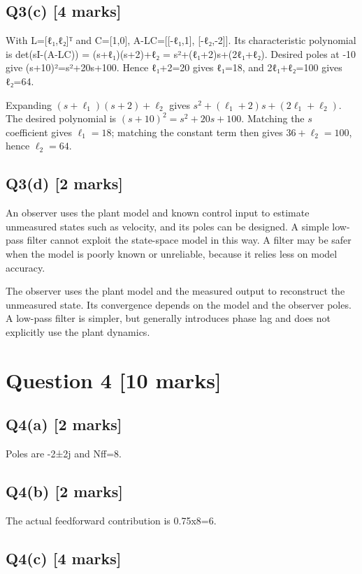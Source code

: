 \documentclass[11pt,a4paper]{article}
\begin{document}
\subsection*{Q3(c) \hfill [4 marks]}

With L=[ℓ₁,ℓ₂]ᵀ and C=[1,0], A-LC=[[-ℓ₁,1], [-ℓ₂,-2]].
Its characteristic polynomial is det(sI-(A-LC)) = (s+ℓ₁)(s+2)+ℓ₂ = s²+(ℓ₁+2)s+(2ℓ₁+ℓ₂).
Desired poles at -10 give (s+10)²=s²+20s+100.
Hence ℓ₁+2=20 gives ℓ₁=18, and 2ℓ₁+ℓ₂=100 gives ℓ₂=64.\par\smallskip Expanding $(s+\ell_1)(s+2)+\ell_2$ gives $s^2+(\ell_1+2)s+(2\ell_1+\ell_2)$. The desired polynomial is $(s+10)^2=s^2+20s+100$. Matching the $s$ coefficient gives $\ell_1=18$; matching the constant term then gives $36+\ell_2=100$, hence $\ell_2=64$.

\subsection*{Q3(d) \hfill [2 marks]}

An observer uses the plant model and known control input to estimate unmeasured states such as velocity, and its poles can be designed.
A simple low-pass filter cannot exploit the state-space model in this way.
A filter may be safer when the model is poorly known or unreliable, because it relies less on model accuracy.\par\smallskip The observer uses the plant model and the measured output to reconstruct the unmeasured state. Its convergence depends on the model and the observer poles. A low-pass filter is simpler, but generally introduces phase lag and does not explicitly use the plant dynamics.

\section*{Question 4 \hfill [10 marks]}
\subsection*{Q4(a) \hfill [2 marks]}

Poles are -2±2j and Nff=8.

\subsection*{Q4(b) \hfill [2 marks]}

The actual feedforward contribution is 0.75x8=6.

\subsection*{Q4(c) \hfill [4 marks]}
\end{document}

